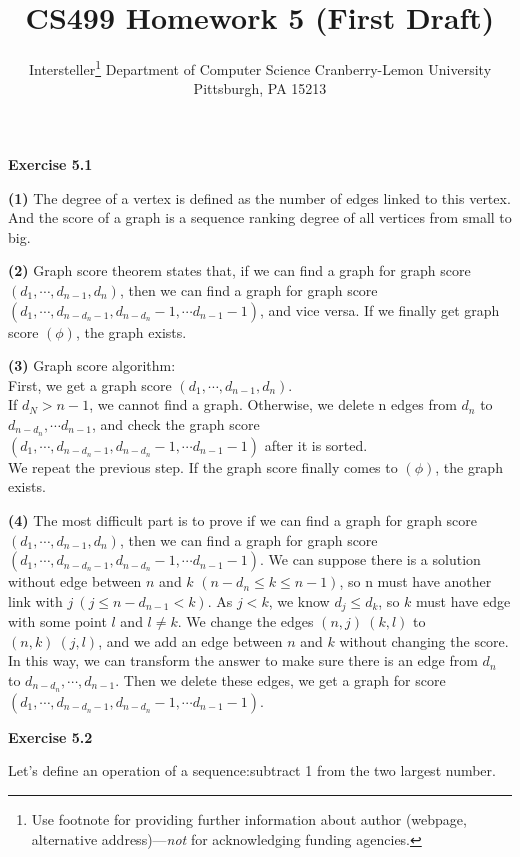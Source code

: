 \documentclass{article} %
\title{CS499 Homework 5 (First Draft)}
\author{
	Intersteller\thanks{ Use footnote for providing further information
		about author (webpage, alternative address)---\emph{not} for acknowledging
		funding agencies.}
	Department of Computer Science
	Cranberry-Lemon University
	Pittsburgh, PA 15213
}
\begin{document}
	\maketitle
	\textbf{Exercise 5.1}\par

\textbf{(1)} The degree of a vertex is defined as the number of edges linked to this vertex. And the score of a graph is a sequence ranking degree of all vertices from small to big.\par

\textbf{(2)} Graph score theorem states that, if we can find a graph for graph score $(d_1, \cdots ,d_{n-1},d_n)$, then we can find a graph for graph score $(d_1, \cdots ,d_{n-d_n-1},d_{n-d_n}-1,\cdots d_{n-1}-1)$, and vice versa. If we finally get graph score $(\phi)$, the graph exists.\par

\textbf{(3)} Graph score algorithm:\\
First, we get a graph score $(d_1, \cdots ,d_{n-1},d_n)$.\\
If $d_N>n-1$, we cannot find a graph. Otherwise, we delete n edges from $d_n$ to $d_{n-d_n},\cdots d_{n-1}$, and check the graph score $(d_1, \cdots ,d_{n-d_n-1},d_{n-d_n}-1,\cdots d_{n-1}-1)$ after it is sorted.\\
We repeat the previous step. If the graph score finally comes to $(\phi)$, the graph exists.\par

\textbf{(4)} The most difficult part is to prove if we can find a graph for graph score $(d_1, \cdots ,d_{n-1},d_n)$, then we can find a graph for graph score $(d_1, \cdots ,d_{n-d_n-1},d_{n-d_n}-1,\cdots d_{n-1}-1)$. We can suppose there is a solution without edge between $n$ and $k$ $(n-d_n\leq k\leq n-1)$, so n must have another link with $j \ (j\leq n-d_{n-1}<k)$. As $j<k$, we know $d_j\leq d_k$, so $k$ must have edge with some point $l$ and $l\neq k$. We change the edges $(n,j)\  (k,l)$ to $(n,k)\  (j,l)$, and we add an edge between $n$ and $k$ without changing the score. In this way, we can transform the answer to make sure there is an edge from $d_n$ to $d_{n-d_n},\cdots ,d_{n-1}$. Then we delete these edges, we get a graph for score $(d_1, \cdots ,d_{n-d_n-1},d_{n-d_n}-1,\cdots d_{n-1}-1)$.\par

\textbf{Exercise 5.2}\par
	Let's define an operation of a sequence:subtract 1 from the two largest number. \par
\end{document}
